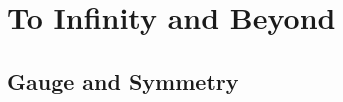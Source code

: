 \chapter{To Infinity and Beyond}\label{chap:To Infinity and Beyond} %

\section{Gauge and Symmetry}
